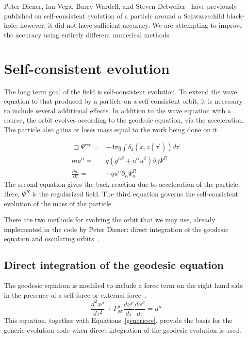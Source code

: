Peter Diener, Ian Vega, Barry Wardell, and Steven Detweiler~\cite{diener_vega_wardell_detwieler_2012} have previously published on self-consistent evolution of a particle around a Schwarzschild black-hole; however, it did not have sufficient accuracy. We are attempting to improve the accuracy using entirely different numerical methods.

\section{Self-consistent evolution}



The long term goal of the field is self-consistent evolution. To extend the wave equation to that produced by a particle on a self-consistent orbit, it is necessary to include several additional effects. In addition to the wave equation with a source, the orbit evolves according to the geodesic equation, via the acceleration. The particle also gains or loses mass equal to the work being done on it. 

\begin{eqnarray}
  \Box\Psi^{ret} =& -4\pi q \int\delta_4(x,z(\tau^\prime))d\tau^\prime\nonumber\\
    ma^\alpha=&q(g^{\alpha\beta}+u^\alpha u^\beta)\partial_\beta\Psi^{R}\nonumber\\
    \frac{\partial m}{\partial \tau}=&-q u^\alpha\partial_\alpha \Psi^R_\alpha
    \label{genericev}
\end{eqnarray}
The second equation gives the back-reaction due to acceleration of the particle. Here, $\Psi^R$ is the regularized field. The third equation governs the self-consistent evolution of the mass of the particle.~\cite{WardellSelfForceReview}

There are two methods for evolving the orbit that we may use, already implemented in the code by Peter Diener: direct integration of the geodesic equation and osculating orbits~\cite{pound_poisson}.

\subsection{Direct integration of the geodesic equation}
The geodesic equation is modified to include a force term on the right hand side in the presence of a self-force or external force~\cite{Carroll}.
\begin{equation}
  \frac{d^2x^\mu}{d\tau^2}+\Gamma^\mu_{\rho\sigma}\frac{dx^\rho}{d\tau}\frac{dx^\sigma}{d\tau}=a^\mu
\end{equation}
This equation, together with Equations~\ref{genericev}, provide the basis for the generic evolution code when direct integration of the geodesic evolution is used. 

